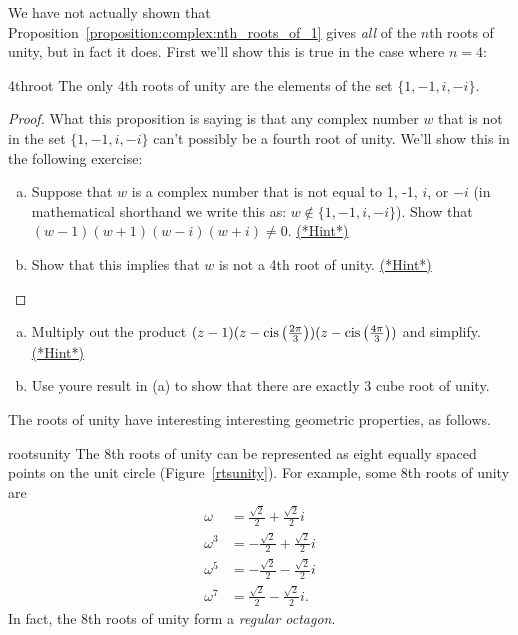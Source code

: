 {We have not actually shown that Proposition~\ref{proposition:complex:nth_roots_of_1} gives \emph{all} of the $n$th roots of unity, but in fact it does. First we'll  show this is true in the case where $n=4$:

\begin{prop}{4throot}
 The only 4th roots of unity are the elements of the set $\{1,-1,i,-i\}$.
\end{prop}

\begin{proof}
What this proposition is saying is that any complex number $w$ that is not in the set $\{1,-1,i,-i\}$ can't possibly be a fourth root of unity. We'll show  this in the following exercise: 

\begin{exercise}{50}

\begin{enumerate}[(a)]
\item
Suppose that $w$ is a complex number that is not equal to 1, -1, $i$, or $-i$ (in mathematical shorthand we write this as: $w \notin \{1,-1,i,-i \}$). Show that $(w-1)(w+1)(w-i)(w+i) \neq 0$.
\hyperref[sec:complex:hints]{(*Hint*)}
\item
Show that this implies that $w$ is not a 4th root of unity.
\hyperref[sec:complex:hints]{(*Hint*)}
\end{enumerate}
\end{exercise}
\end{proof}

\begin{exercise}{51}
\begin{enumerate}[(a)]
\item
Multiply out the product $(z - 1)(z - \operatorname{cis}\left(\frac{2\pi}{3}\right))(z - \operatorname{cis}\left(\frac{4\pi}{3}\right))$ and simplify.
\hyperref[sec:complex:hints]{(*Hint*)}
\item
Use youre result in (a) to show that there are exactly 3 cube root of unity. 
\end{enumerate}
\end{exercise}

The roots of unity have interesting interesting geometric properties, as follows.

\begin{example}{rootsunity} The 8th roots of unity can be represented
as eight equally spaced points on the unit circle (Figure~\ref{rtsunity}).
For example, some 8th roots of unity are \begin{align*}
\omega & =\frac{\sqrt{2}}{2}+\frac{\sqrt{2}}{2}i\\
\omega^{3} & =-\frac{\sqrt{2}}{2}+\frac{\sqrt{2}}{2}i\\
\omega^{5} & =-\frac{\sqrt{2}}{2}-\frac{\sqrt{2}}{2}i\\
\omega^{7} & =\frac{\sqrt{2}}{2}-\frac{\sqrt{2}}{2}i.\end{align*}
In fact, the 8th roots of unity form a \emph{regular octagon}.
 \end{example}

}
